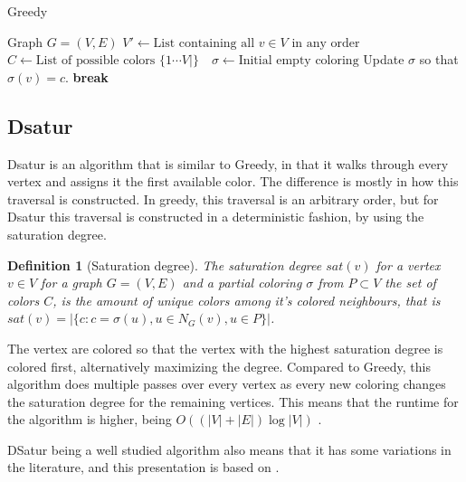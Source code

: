 \documentclass[a4paper]{article}
\newtheorem{definition}{Definition}[section]
\newcommand{\algorithmicbreak}{\textbf{break}}
\newcommand{\BREAK}{\STATE \algorithmicbreak}
\begin{document}
\begin{algorithm}[H]
  \caption{Greedy}
  \label{alg:greedy}
  \begin{algorithmic}[1]
      \REQUIRE Graph $G = (V,E)$
      \STATE $V' \leftarrow \text{List containing all $v \in V$ in any order}$
      \STATE $C \leftarrow \text{List of possible colors $\{1 \cdots V| \}$ }$
      \STATE $\sigma \leftarrow \text{Initial empty coloring}$
                \STATE Update $\sigma$ so that $\sigma(v) = c$.
                \BREAK
            \ENDIF
        \ENDFOR
    \ENDFOR
  \end{algorithmic}
\end{algorithm}
\subsection{Dsatur}

Dsatur is an algorithm that is similar to Greedy, in that it walks through every
vertex and assigns it the first available color. The difference is mostly in
how this traversal is constructed. In greedy, this traversal is an arbitrary
order, but for Dsatur this traversal is constructed in a deterministic fashion,
by using the saturation degree.

\begin{definition}[Saturation degree]{\cite{Constructive}}
    The saturation degree $sat(v)$ for a vertex $v \in V$ for a graph $G =
    (V,E)$ and a partial coloring $\sigma$ from $P \subset V$ the set of colors $C$, is the amount of unique colors among
    it's colored neighbours, that is $sat(v) = |\{c  : c = \sigma(u), u \in N_G(v),u \in P  \}|$.
\end{definition}

The vertex are colored so that the vertex with the highest saturation degree is
colored first, alternatively maximizing the degree. Compared to Greedy, this
algorithm does multiple passes over every vertex as every new coloring changes
the saturation degree for the remaining vertices. This means that the runtime
for the algorithm is higher, being
$O((|V|+|E|)\log{|V|})$ \cite{Constructive}.

DSatur being a well studied algorithm also means that it has some variations in 
the literature, and this presentation is based on \cite{Constructive}.
\end{document}
